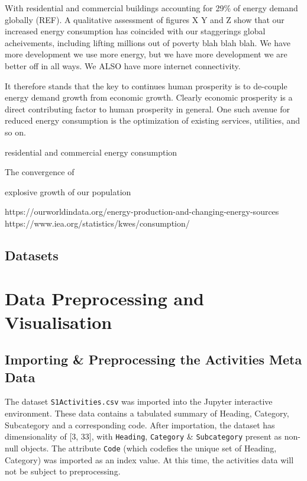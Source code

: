 \documentclass[11pt]{article}
\begin{document}
With residential and commercial buildings accounting for 29\% of energy
demand globally (REF). A qualitative assessment of figures X Y and Z
show that our increased energy consumption has coincided with our
staggerings global acheivements, including lifting millions out of
poverty blah blah blah. We have more development we use more energy, but
we have more development we are better off in all ways. We ALSO have
more internet connectivity.

It therefore stands that the key to continues human prosperity is to
de-couple energy demand growth from economic growth. Clearly economic
prosperity is a direct contributing factor to human prosperity in
general. One such avenue for reduced energy consumption is the
optimization of existing services, utilities, and so on.

residential and commercial energy consumption

The convergence of

explosive growth of our population

https://ourworldindata.org/energy-production-and-changing-energy-sources
https://www.iea.org/statistics/kwes/consumption/

    

    \hypertarget{datasets}{%
\subsection{Datasets}\label{datasets}}

    \hypertarget{data-preprocessing-and-visualisation}{%
\section{Data Preprocessing and
Visualisation}\label{data-preprocessing-and-visualisation}}

    \hypertarget{importing-preprocessing-the-activities-meta-data}{%
\subsection{Importing \& Preprocessing the Activities Meta
Data}\label{importing-preprocessing-the-activities-meta-data}}

    The dataset \texttt{S1Activities.csv} was imported into the Jupyter
interactive environment. These data contains a tabulated summary of
Heading, Category, Subcategory and a corresponding code. After
importation, the dataset has dimensionality of {[}3, 33{]}, with
\texttt{Heading}, \texttt{Category} \& \texttt{Subcategory} present as
non-null objects. The attribute \texttt{Code} (which codefies the unique
set of Heading, Category) was imported as an index value. At this time,
the activities data will not be subject to preprocessing.
\end{document}
